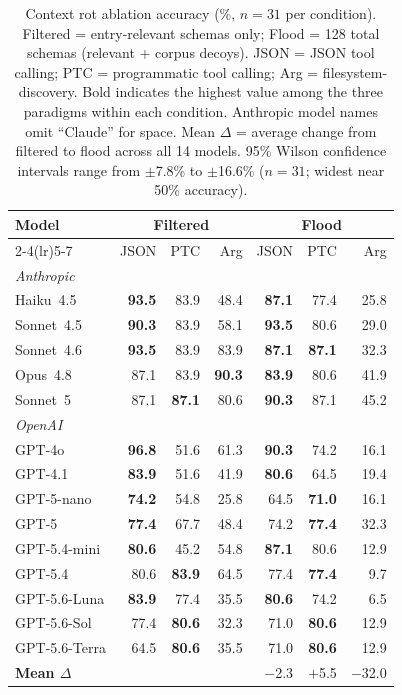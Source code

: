 \documentclass[11pt]{article}
\begin{document}
\begin{table}[t]
\centering
\footnotesize
\setlength{\tabcolsep}{2pt}
\begin{tabular}{lrrrrrr}
\toprule
\textbf{Model} & \multicolumn{3}{c}{\textbf{Filtered}} & \multicolumn{3}{c}{\textbf{Flood}} \\
\cmidrule(lr){2-4}\cmidrule(lr){5-7}
 & JSON & PTC & Arg & JSON & PTC & Arg \\
\midrule
\multicolumn{7}{l}{\textit{Anthropic}} \\
Haiku~4.5  & \textbf{93.5} & 83.9 & 48.4 & \textbf{87.1} & 77.4 & 25.8 \\
Sonnet~4.5 & \textbf{90.3} & 83.9 & 58.1 & \textbf{93.5} & 80.6 & 29.0 \\
Sonnet~4.6 & \textbf{93.5} & 83.9 & 83.9 & \textbf{87.1} & \textbf{87.1} & 32.3 \\
Opus~4.8   & 87.1 & 83.9 & \textbf{90.3} & \textbf{83.9} & 80.6 & 41.9 \\
Sonnet~5   & 87.1 & \textbf{87.1} & 80.6 & \textbf{90.3} & 87.1 & 45.2 \\
\midrule
\multicolumn{7}{l}{\textit{OpenAI}} \\
GPT-4o       & \textbf{96.8} & 51.6 & 61.3 & \textbf{90.3} & 74.2 & 16.1 \\
GPT-4.1      & \textbf{83.9} & 51.6 & 41.9 & \textbf{80.6} & 64.5 & 19.4 \\
GPT-5-nano   & \textbf{74.2} & 54.8 & 25.8 & 64.5 & \textbf{71.0} & 16.1 \\
GPT-5        & \textbf{77.4} & 67.7 & 48.4 & 74.2 & \textbf{77.4} & 32.3 \\
GPT-5.4-mini & \textbf{80.6} & 45.2 & 54.8 & \textbf{87.1} & 80.6 & 12.9 \\
GPT-5.4      & 80.6 & \textbf{83.9} & 64.5 & 77.4 & \textbf{77.4} &  9.7 \\
GPT-5.6-Luna & \textbf{83.9} & 77.4 & 35.5 & \textbf{80.6} & 74.2 &  6.5 \\
GPT-5.6-Sol  & 77.4 & \textbf{80.6} & 32.3 & 71.0 & \textbf{80.6} & 12.9 \\
GPT-5.6-Terra & 64.5 & \textbf{80.6} & 35.5 & 71.0 & \textbf{80.6} & 12.9 \\
\midrule
\textbf{Mean $\Delta$} & & & & $-$2.3 & $+$5.5 & $-$32.0 \\
\bottomrule
\end{tabular}
\caption{Context rot ablation accuracy (\%, $n=31$ per condition). Filtered =
entry-relevant schemas only; Flood = 128 total schemas (relevant + corpus decoys).
JSON = JSON tool calling; PTC = programmatic tool calling; Arg = filesystem-discovery.
Bold indicates the highest value among the three paradigms within each condition.
Anthropic model names omit ``Claude'' for space. Mean $\Delta$ = average change from
filtered to flood across all 14 models. 95\% Wilson confidence intervals range
from $\pm$7.8\% to $\pm$16.6\% ($n=31$; widest near 50\% accuracy).}
\label{tab:flood}
\end{table}
\end{document}
